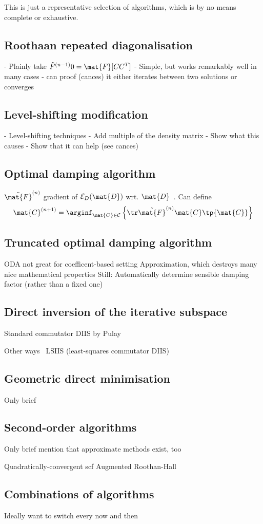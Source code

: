 
This is just a representative selection of algorithms,
which is by no means complete or exhaustive.

\subsection{Roothaan repeated diagonalisation}
\label{sec:RoothaanRepeatedDiag}
- Plainly take $\tilde{F}^{(n-1)}0= \mat{F}[CC^T]$
- Simple, but works remarkably well in many cases
- can proof (cances) it either iterates between two solutions or converges

\subsection{Level-shifting modification}
- Level-shifting techniques \cite{Mehrotra1977}
- Add multiple of the density matrix
- Show what this causes
- Show that it can help (see cances)

\subsection{Optimal damping algorithm}
\label{sec:ODA}
$\tilde{\mat{F}}^{(n)}$ gradient of $\mathcal{E}_D(\mat{D})$
wrt. $\mat{D}$~\cite{Lions1988,Cances2000}.
Can define~\cite{Lions1988,Cances2000}
\[
	\mat{C}^{(n+1)} = \arginf_{\mat{C} \in \mathcal{C}}
\left\{ \tr \tilde{\mat{F}}^{(n)} \mat{C} \tp{\mat{C}} \right\} \]

\subsection{Truncated optimal damping algorithm}
ODA not great for coefficent-based setting
Approximation, which destroys many nice mathematical properties
Still: Automatically determine sensible damping factor (rather than a fixed one)

\subsection{Direct inversion of the iterative subspace}

Standard commutator DIIS by Pulay

Other ways~\cite{Shepard2007}
LSIIS (least-squares commutator DIIS)~\cite{Li2016}

\subsection{Geometric direct minimisation}
Only brief

\subsection{Second-order \SCF algorithms}
Only brief
mention that approximate methods exist, too

Quadratically-convergent scf \cite{Ochsenfeld1997}
Augmented Roothan-Hall \cite{Hoest2008}

\subsection{Combinations of algorithms}
Ideally want to switch every now and then

